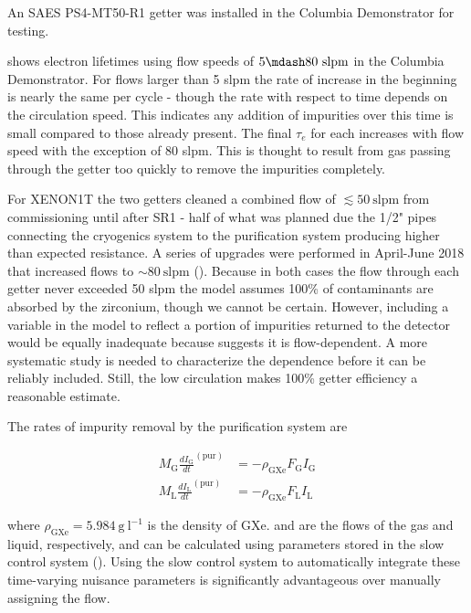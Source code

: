 An SAES PS4-MT50-R1 getter was installed in the Columbia Demonstrator for testing.

 shows electron lifetimes using flow speeds of $5 \mdash 80\ \mathrm{slpm}$
in the Columbia Demonstrator.  For flows larger than 5 slpm the rate of increase in the beginning is nearly the same per cycle - though
the rate with respect to time depends on the circulation speed.  This indicates any addition of impurities over this time is small
compared to those already present.  The final $\tau_e$ for each increases with flow speed with the exception of 80 slpm.  This is thought
to result from gas passing through the getter too quickly to remove the impurities completely.

For XENON1T the two getters cleaned a combined flow of $\lesssim 50\ \mathrm{slpm}$ from commissioning until after SR1 - half of what was
planned due the 1/2" pipes connecting the cryogenics system to the purification system producing higher than expected resistance.  A
series of
upgrades were performed in April-June 2018 that increased flows to ${\sim} 80\ \mathrm{slpm}$
().  Because in both cases the
flow through each getter never exceeded 50 slpm the model assumes 100\% of contaminants are absorbed by the zirconium, though we cannot
be certain.  However, including a variable in the model to reflect a portion of impurities returned
to the detector would be equally inadequate because  suggests it is
flow-dependent.  A more systematic study is needed to characterize the dependence before it can be reliably included.  Still, the low
circulation makes 100\% getter efficiency a reasonable estimate.

The rates of impurity removal by the purification system are

\begin{subequations}
\begin{align}
M_{\mathrm{G}} \frac{dI_{\mathrm{G}}}{dt}^{(\mathrm{pur})} &= -\rho_{\mathrm{GXe}} F_{\mathrm{G}} I_{\mathrm{G}}
\label{eq:electron_lifetime_model_removal_gxe}
\\
M_{\mathrm{L}} \frac{dI_{\mathrm{L}}}{dt}^{(\mathrm{pur})} &= -\rho_{\mathrm{GXe}} F_{\mathrm{L}} I_{\mathrm{L}}
\label{eq:electron_lifetime_model_removal_lxe}
\end{align}
\end{subequations}

\noindent where $\rho_{\mathrm{GXe}} = 5.984\ \mathrm{g\ l^{-1}}$ is the density of GXe.  \fg and \fl are the flows of the
gas and liquid, respectively, and can be calculated using parameters stored in the slow control system
().  Using the slow control system to automatically integrate these time-varying nuisance
parameters is significantly advantageous over manually assigning the flow.

